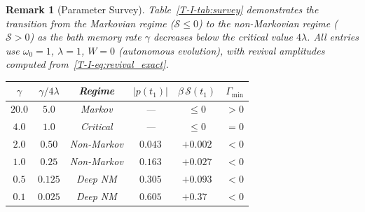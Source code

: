 \documentclass[12pt,a4paper,openany]{book}
\newtheorem{remark}[theorem]{Remark}
\begin{document}
\begin{remark}[Parameter Survey]
\label{T-I-rem:parameter_survey}
Table~\ref{T-I-tab:survey} demonstrates the transition from
the Markovian regime ($\mathcal{S} \leq 0$) to the
non-Markovian regime ($\mathcal{S} > 0$) as the bath
memory rate $\gamma$ decreases below the critical value
$4\lambda$.
All entries use $\omega_0 = 1$, $\lambda = 1$,
$W = 0$ (autonomous evolution), with revival amplitudes
computed from~\eqref{T-I-eq:revival_exact}.
\begin{center}
\begin{tabular}{@{}cccccc@{}}
\toprule
$\gamma$ & $\gamma/4\lambda$ & Regime
& $|p(t_1)|$ & $\beta\,\mathcal{S}(t_1)$
& $\Gamma_{\min}$ \\
\midrule
$20.0$ & $5.0$ & Markov & --- & $\leq 0$ & $>0$ \\
$4.0$ & $1.0$ & Critical & --- & $\leq 0$ & $= 0$ \\
$2.0$ & $0.50$ & Non-Markov & $0.043$
  & $+0.002$ & $< 0$ \\
$1.0$ & $0.25$ & Non-Markov & $0.163$
  & $+0.027$ & $< 0$ \\
$0.5$ & $0.125$ & Deep NM & $0.305$
  & $+0.093$ & $< 0$ \\
$0.1$ & $0.025$ & Deep NM & $0.605$
  & $+0.37\phantom{0}$ & $< 0$ \\
\bottomrule
\end{tabular}
\end{center}
\captionsetup{hypcap=false}%
\label{T-I-tab:survey}
\end{remark}
\end{document}
